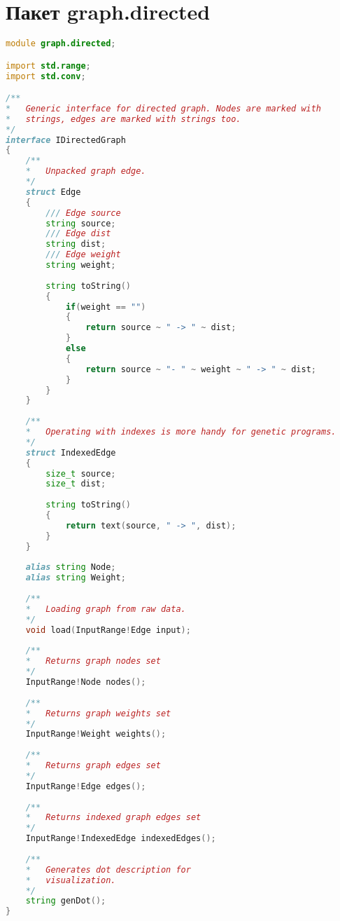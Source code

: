 \documentclass[russian,utf8,emptystyle]{eskdtext}
\begin{document}
\section{Пакет graph.directed}
\begin{lstlisting}[language=D]
module graph.directed;

import std.range;
import std.conv;

/**
*   Generic interface for directed graph. Nodes are marked with
*   strings, edges are marked with strings too.
*/
interface IDirectedGraph
{
    /**
    *   Unpacked graph edge.
    */
    struct Edge
    {
        /// Edge source
        string source;
        /// Edge dist
        string dist;
        /// Edge weight
        string weight;
        
        string toString()
        {
            if(weight == "")
            {
                return source ~ " -> " ~ dist;
            } 
            else
            {
                return source ~ "- " ~ weight ~ " -> " ~ dist;
            }
        }
    }
    
    /**
    *   Operating with indexes is more handy for genetic programs.
    */
    struct IndexedEdge
    {
        size_t source;
        size_t dist;
        
        string toString()
        {
            return text(source, " -> ", dist);
        }
    }
    
    alias string Node;
    alias string Weight;
    
    /**
    *   Loading graph from raw data.
    */
    void load(InputRange!Edge input);
    
    /**
    *   Returns graph nodes set
    */
    InputRange!Node nodes();
    
    /**
    *   Returns graph weights set
    */
    InputRange!Weight weights();
    
    /**
    *   Returns graph edges set
    */
    InputRange!Edge edges();
    
    /**
    *   Returns indexed graph edges set
    */
    InputRange!IndexedEdge indexedEdges();
    
    /**
    *   Generates dot description for
    *   visualization.
    */
    string genDot();
}

\end{lstlisting}
\end{document}
